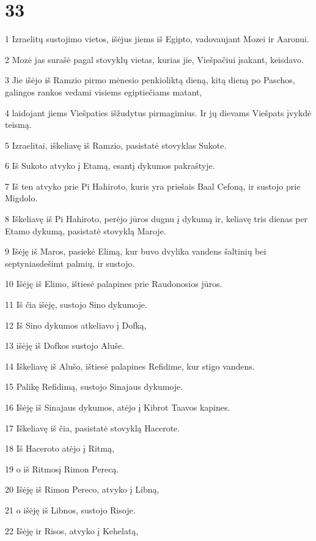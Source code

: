 \chapter{33}


\par 1 Izraelitų sustojimo vietos, išėjus jiems iš Egipto, vadovaujant Mozei ir Aaronui. 
\par 2 Mozė jas surašė pagal stovyklų vietas, kurias jie, Viešpačiui įsakant, keisdavo. 
\par 3 Jie išėjo iš Ramzio pirmo mėnesio penkioliktą dieną, kitą dieną po Paschos, galingos rankos vedami visiems egiptiečiams matant, 
\par 4 laidojant jiems Viešpaties išžudytus pirmagimius. Ir jų dievams Viešpats įvykdė teismą. 
\par 5 Izraelitai, iškeliavę iš Ramzio, pasistatė stovyklas Sukote. 
\par 6 Iš Sukoto atvyko į Etamą, esantį dykumos pakraštyje. 
\par 7 Iš ten atvyko prie Pi Hahiroto, kuris yra priešais Baal Cefoną, ir sustojo prie Migdolo. 
\par 8 Iškeliavę iš Pi Hahiroto, perėjo jūros dugnu į dykumą ir, keliavę tris dienas per Etamo dykumą, pasistatė stovyklą Maroje. 
\par 9 Išėję iš Maros, pasiekė Elimą, kur buvo dvylika vandens šaltinių bei septyniasdešimt palmių, ir sustojo. 
\par 10 Išėję iš Elimo, ištiesė palapines prie Raudonosios jūros. 
\par 11 Iš čia išėję, sustojo Sino dykumoje. 
\par 12 Iš Sino dykumos atkeliavo į Dofką, 
\par 13 išėję iš Dofkos sustojo Aluše. 
\par 14 Iškeliavę iš Alušo, ištiesė palapines Refidime, kur stigo vandens. 
\par 15 Palikę Refidimą, sustojo Sinajaus dykumoje. 
\par 16 Išėję iš Sinajaus dykumos, atėjo į Kibrot Taavos kapines. 
\par 17 Iškeliavę iš čia, pasistatė stovyklą Hacerote. 
\par 18 Iš Haceroto atėjo į Ritmą, 
\par 19 o iš Ritmos­į Rimon Perecą. 
\par 20 Išėję iš Rimon Pereco, atvyko į Libną, 
\par 21 o išėję iš Libnos, sustojo Risoje. 
\par 22 Išėję ir Risos, atvyko į Kehelatą, 
